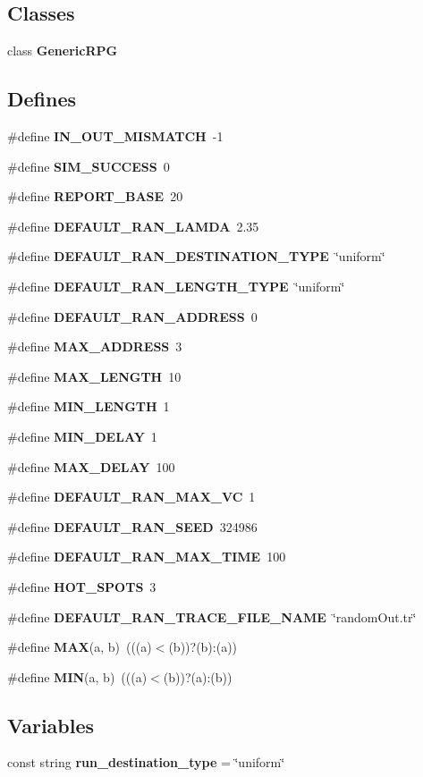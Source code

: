 \subsection*{Classes}
\begin{CompactItemize}
\item 
class {\bf GenericRPG}
\end{CompactItemize}
\subsection*{Defines}
\begin{CompactItemize}
\item 
\#define {\bf IN\_\-OUT\_\-MISMATCH}~-1
\item 
\#define {\bf SIM\_\-SUCCESS}~0
\item 
\#define {\bf REPORT\_\-BASE}~20
\item 
\#define {\bf DEFAULT\_\-RAN\_\-LAMDA}~2.35
\item 
\#define {\bf DEFAULT\_\-RAN\_\-DESTINATION\_\-TYPE}~\char`\"{}uniform\char`\"{}
\item 
\#define {\bf DEFAULT\_\-RAN\_\-LENGTH\_\-TYPE}~\char`\"{}uniform\char`\"{}
\item 
\#define {\bf DEFAULT\_\-RAN\_\-ADDRESS}~0
\item 
\#define {\bf MAX\_\-ADDRESS}~3
\item 
\#define {\bf MAX\_\-LENGTH}~10
\item 
\#define {\bf MIN\_\-LENGTH}~1
\item 
\#define {\bf MIN\_\-DELAY}~1
\item 
\#define {\bf MAX\_\-DELAY}~100
\item 
\#define {\bf DEFAULT\_\-RAN\_\-MAX\_\-VC}~1
\item 
\#define {\bf DEFAULT\_\-RAN\_\-SEED}~324986
\item 
\#define {\bf DEFAULT\_\-RAN\_\-MAX\_\-TIME}~100
\item 
\#define {\bf HOT\_\-SPOTS}~3
\item 
\#define {\bf DEFAULT\_\-RAN\_\-TRACE\_\-FILE\_\-NAME}~\char`\"{}randomOut.tr\char`\"{}
\item 
\#define {\bf MAX}(a, b)~(((a)$<$(b))?(b):(a))
\item 
\#define {\bf MIN}(a, b)~(((a)$<$(b))?(a):(b))
\end{CompactItemize}
\subsection*{Variables}
\begin{CompactItemize}
\item 
const string {\bf run\_\-destination\_\-type} = \char`\"{}uniform\char`\"{}
\end{CompactItemize}


